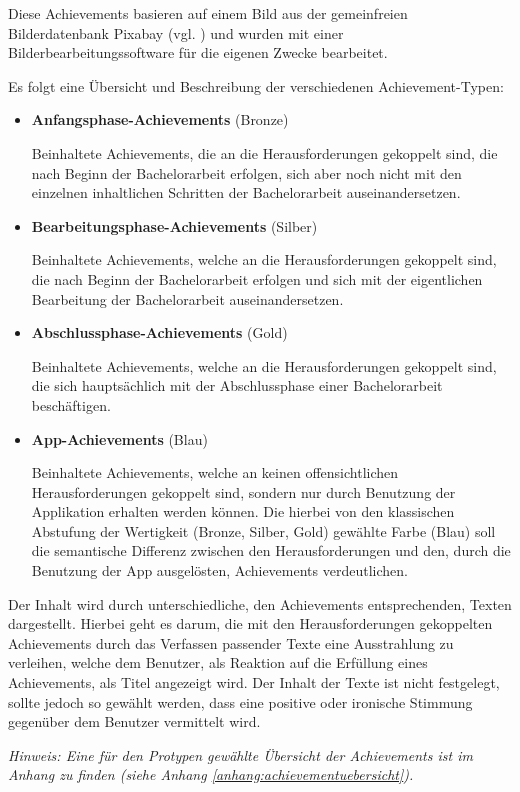 \documentclass[bibliography=totoc,listof=totoc,BCOR=5mm,DIV=12,oneside]{scrbook}
\begin{document}
\par \medskip Diese Achievements basieren auf einem Bild aus der gemeinfreien Bilderdatenbank Pixabay (vgl. \citep{PixabayAchievement}) und wurden mit einer Bilderbearbeitungssoftware für die eigenen Zwecke bearbeitet.

\par \bigskip Es folgt eine Übersicht und Beschreibung der verschiedenen Achievement-Typen:
\begin{itemize}
\item \textbf{Anfangsphase-Achievements} (Bronze)
\par Beinhaltete Achievements, die an die Herausforderungen gekoppelt sind, die nach Beginn der Bachelorarbeit erfolgen, sich aber noch nicht mit den einzelnen inhaltlichen Schritten der Bachelorarbeit auseinandersetzen.
\item \textbf{Bearbeitungsphase-Achievements} (Silber)
\par Beinhaltete Achievements, welche an die Herausforderungen gekoppelt sind, die nach Beginn der Bachelorarbeit erfolgen und sich mit der eigentlichen Bearbeitung der Bachelorarbeit auseinandersetzen.
\item \textbf{Abschlussphase-Achievements} (Gold)
\par Beinhaltete Achievements, welche an die Herausforderungen gekoppelt sind, die sich hauptsächlich mit der Abschlussphase einer Bachelorarbeit beschäftigen.
\item \textbf{App-Achievements} (Blau)
\par Beinhaltete Achievements, welche an keinen offensichtlichen Herausforderungen gekoppelt sind, sondern nur durch Benutzung der Applikation erhalten werden können. Die hierbei von den klassischen Abstufung der Wertigkeit (Bronze, Silber, Gold) gewählte Farbe (Blau) soll die semantische Differenz zwischen den Herausforderungen und den, durch die Benutzung der App ausgelösten, Achievements verdeutlichen. 
\end{itemize} 

\par \bigskip Der Inhalt wird durch unterschiedliche, den Achievements entsprechenden, Texten dargestellt. Hierbei geht es darum, die mit den Herausforderungen gekoppelten Achievements durch das Verfassen passender Texte eine Ausstrahlung zu verleihen, welche dem Benutzer, als Reaktion auf die Erfüllung eines Achievements, als Titel angezeigt wird. Der Inhalt der Texte ist nicht festgelegt, sollte jedoch so gewählt werden, dass eine positive oder ironische Stimmung gegenüber dem Benutzer vermittelt wird.
\par \bigskip \textit{Hinweis: Eine für den Protypen gewählte Übersicht der Achievements ist im Anhang zu finden (siehe Anhang \ref{anhang:achievementuebersicht}).}
\end{document}
